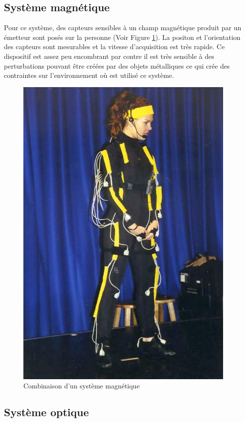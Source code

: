 \subsection{Système magnétique}
Pour ce système, des capteurs sensibles à un champ magnétique produit par un émetteur sont posés sur la personne (Voir Figure \ref{fig9}). La positon et l'orientation des capteurs sont mesurables et la vitesse d'acquisition est très rapide. Ce dispositif est assez peu encombrant par contre il est très sensible à des perturbations pouvant être créées par des objets métalliques ce qui crée des contraintes sur l'environnement où est utilisé ce système.
\begin{figure}[!h]
   	\centerline{\includegraphics[scale=0.4]{./magne}}
   	\caption{\label{fig9} Combinaison d'un système magnétique}
\end{figure}
\subsection{Système optique}

